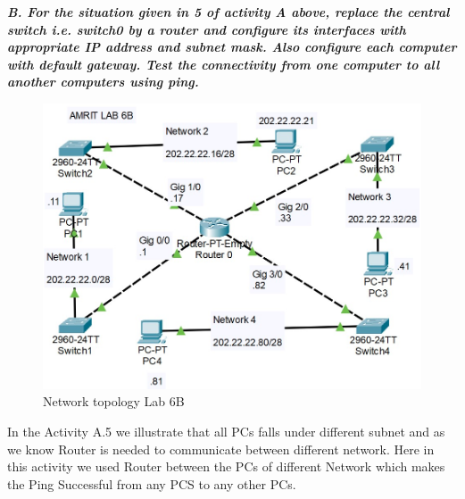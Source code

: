 \documentclass[a4paper,11pt]{article}
\begin{document}
{\bfseries \textit{B. For the situation given in 5 of activity A above, replace the central switch i.e. switch0 by a router and configure its interfaces with appropriate IP address and subnet mask. Also configure each computer with default gateway. Test the connectivity from one computer to all another computers using ping.}}


\begin{figure}[H]
    \centering
    \includegraphics[scale=0.9,cframe=blue 0.5pt 3pt]{./FIG/Lab6B.jpg}
    \caption{Network topology Lab 6B}
\end{figure}




In the Activity A.5 we illustrate that all PCs falls under different subnet and as we know Router is needed to communicate between different network. Here in this activity we used Router  between the PCs of different Network  which makes the Ping Successful from any PCS to any other PCs.






\pagebreak

%
%
%
%
%
%
%
%
%
\end{document}
